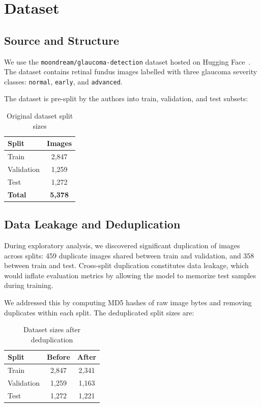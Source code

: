 \documentclass[conference]{IEEEtran}
\begin{document}
\section{Dataset}
\label{sec:dataset}

\subsection{Source and Structure}

We use the \texttt{moondream/glaucoma-detection} dataset hosted on Hugging Face~\cite{hf_glaucoma}.
The dataset contains retinal fundus images labelled with three glaucoma severity classes: \texttt{normal}, \texttt{early}, and \texttt{advanced}.

The dataset is pre-split by the authors into train, validation, and test subsets:

\begin{table}[H]
\centering
\caption{Original dataset split sizes}
\label{tab:original_split}
\begin{tabular}{lc}
\toprule
\textbf{Split} & \textbf{Images} \\
\midrule
Train & 2,847 \\
Validation & 1,259 \\
Test & 1,272 \\
\midrule
\textbf{Total} & \textbf{5,378} \\
\bottomrule
\end{tabular}
\end{table}

\subsection{Data Leakage and Deduplication}

During exploratory analysis, we discovered significant duplication of images across splits: 459 duplicate images shared between train and validation, and 358 between train and test.
Cross-split duplication constitutes data leakage, which would inflate evaluation metrics by allowing the model to memorize test samples during training.

We addressed this by computing MD5 hashes of raw image bytes and removing duplicates within each split.
The deduplicated split sizes are:

\begin{table}[H]
\centering
\caption{Dataset sizes after deduplication}
\label{tab:dedup_split}
\begin{tabular}{lcc}
\toprule
\textbf{Split} & \textbf{Before} & \textbf{After} \\
\midrule
Train & 2,847 & 2,341 \\
Validation & 1,259 & 1,163 \\
Test & 1,272 & 1,221 \\
\bottomrule
\end{tabular}
\end{table}
\end{document}

